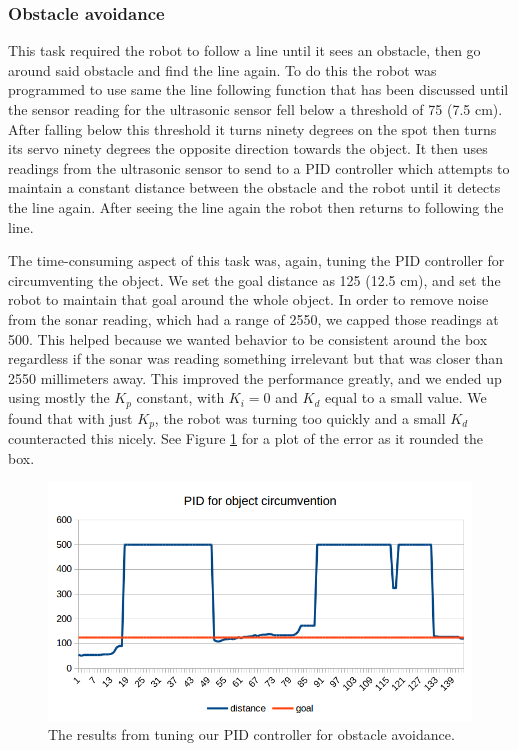 \documentclass[12pt]{article}
\begin{document}
\subsubsection{Obstacle avoidance}

This task required the robot to follow a line until it sees an obstacle, then go around said obstacle and find the line again. To do this the robot was programmed to use same the line following function that has been discussed until the sensor reading for the ultrasonic sensor fell below a threshold of 75 (7.5 cm). After falling below this threshold it turns ninety degrees on the spot then turns its servo ninety degrees the opposite direction towards the object. It then uses readings from the ultrasonic sensor to send to a PID controller which attempts to maintain a constant distance between the obstacle and the robot until it detects the line again. After seeing the line again the robot then returns to following the line.

The time-consuming aspect of this task was, again, tuning the PID controller for circumventing the object. We set the goal distance as 125 (12.5 cm), and set the robot to maintain that goal around the whole object. In order to remove noise from the sonar reading, which had a range of 2550, we capped those readings at 500. This helped because we wanted behavior to be consistent around the box regardless if the sonar was reading something irrelevant but that was closer than 2550 millimeters away. This improved the performance greatly, and we ended up using mostly the $K_p$ constant, with $K_i=0$ and $K_d$ equal to a small value. We found that with just $K_p$, the robot was turning too quickly and a small $K_d$ counteracted this nicely. See Figure \ref{fig:pid_object} for a plot of the error as it rounded the box.

\begin{figure}
	\includegraphics[width=\linewidth]{pid_object_outs}
	\caption{The results from tuning our PID controller for obstacle avoidance.}
	\label{fig:pid_object}
\end{figure}
\end{document}
